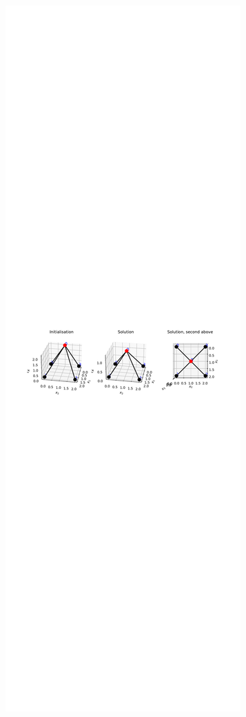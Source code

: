 \begin{figure}
\centering
\begin{subfigure}{.5\textwidth}
  \centering
  \includegraphics[width=\linewidth]{Bilder/localminpos.pdf}

\end{subfigure}
\end{figure}
